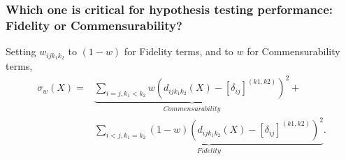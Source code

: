 \documentclass{beamer}
\begin{document}
\begin{frame} 
\frametitle{Which one is critical for hypothesis testing performance: Fidelity or Commensurability?}
Setting $w_{ij{k_1}{k_2}}$ to $(1-w)$ for Fidelity terms, and to $w$ for Commensurability terms,\\
\begin{align*}
\sigma_w(X)=&\underbrace{\sum_{i=j,k_1 < k_2} {w(d_{ij{k_1}{k_2}}(X)-{[\delta_{ij}]^{(k1,k2)}})^2  }}_{Commensurability} +\\
&\underbrace{\sum_{i< j,k_1=k_2} {(1-w)(d_{ijk_1k_2}(X)-{[\delta_{ij}]^{(k1,k2)}})^2  }}_{Fidelity}.
\end{align*}
\end{frame}
\end{document}
